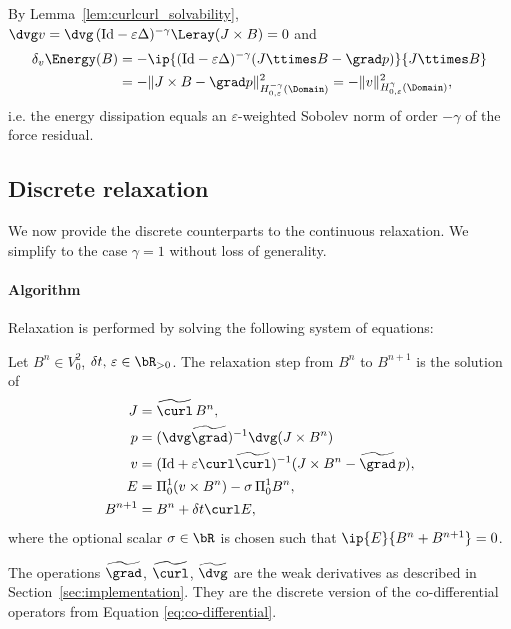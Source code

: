 \documentclass[%
 reprint,
 superscriptaddress,
 amsmath,amssymb,
 aps, nofootinbib, floatfix]{revtex4-2}
\begin{document}
By Lemma~\ref{lem:curlcurl_solvability}, $\dvg v = \dvg \, (\mathrm{Id} - \varepsilon \Delta)^{-\gamma} \Leray (J \times B) = 0$ and
\begin{align}
    \delta_v \Energy(B)
    &= -\ip{(\mathrm{Id} - \varepsilon \Delta)^{-\gamma} (J \ttimes B - \grad p)}{J \ttimes B} \\    
    &= - \| J \times B - \grad p \|^2_{H_{0,\varepsilon}^{-\gamma}(\Domain)} = - \| v \|^2_{H_{0,\varepsilon}^{\gamma}(\Domain)},
    \notag
\end{align}
i.e. the energy dissipation equals an $\varepsilon$-weighted Sobolev norm of order $-\gamma$ of the force residual.

\subsection{Discrete relaxation}
\label{sec:discrete_relaxation}
We now provide the discrete counterparts to the continuous relaxation. We simplify to the case $\gamma = 1$ without loss of generality.

\paragraph{Algorithm}
Relaxation is performed by solving the following system of equations:
\begin{definition}
    \label{def:relaxation_step}
    Let $B^n \in V^2_{0}$, $\delta t, \, \varepsilon \in \bR_{> 0}$. The relaxation step from $B^n$ to $B^{n+1}$ is the solution of
\begin{align}
    \label{eq:relaxation_algo}
    J          &= \widetilde{\curl} \, B^{n}, \\
    p           &= (\dvg \widetilde{\grad})^{-1} \dvg (J \times B^n) \\
    v &= (\mathrm{Id} + \varepsilon \curl \widetilde{\curl})^{-1} (J \times B^n - \widetilde{\grad} \, p), \\
    E           &= {\Pi}^1_0 (v \times B^n) - \sigma \, {\Pi}^1_0 B^n, \\    
    B^{n+1}     &= B^n + \delta t \curl E,
    \label{eq:relaxation_algo_E}
\end{align}
    where the optional scalar $\sigma \in \bR$ is chosen such that $\ip{E}{B^n + B^{n+1}} = 0$.   
\end{definition}

The operations $\widetilde{\grad}$, $\widetilde{\curl}$, $\widetilde{\dvg}$ are the weak derivatives as described in Section~\ref{sec:implementation}. They are the discrete version of the co-differential operators from Equation \eqref{eq:co-differential}.   
\end{document}
